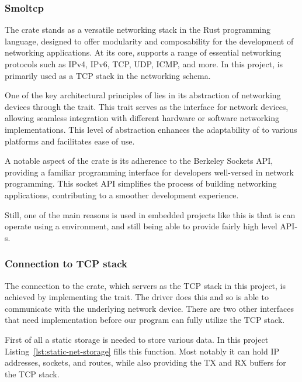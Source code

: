 \subsubsection{Smoltcp}

The  crate stands as a versatile networking stack in the Rust programming language, designed to offer modularity and composability for the development of networking applications. At its core,  supports a range of essential networking protocols such as IPv4, IPv6, TCP, UDP, ICMP, and more. In this project,  is primarily used as a TCP stack in the networking schema. \cite{Smoltcp}

One of the key architectural principles of  lies in its abstraction of networking devices through the  trait. This trait serves as the interface for network devices, allowing seamless integration with different hardware or software networking implementations. This level of abstraction enhances the adaptability of  to various platforms and facilitates ease of use.

A notable aspect of the crate is its adherence to the Berkeley Sockets API, providing a familiar programming interface for developers well-versed in network programming. This socket API simplifies the process of building networking applications, contributing to a smoother development experience.

Still, one of the main reasons  is used in embedded projects like this is that is can operate using a  environment, and still being able to provide fairly high level API-s.

\subsubsection{Connection to TCP stack}

The connection to the  crate, which servers as the TCP stack in this project, is achieved by implementing the  trait. The driver does this and so  is able to communicate with the underlying network device. There are two other interfaces that need implementation before our program can fully utilize the TCP stack.

First of all a static storage is needed to store various data. In this project Listing~\ref{lst:static-net-storage} fills this function. Most notably it can hold IP addresses, sockets, and routes, while also providing the TX and RX buffers for the TCP stack.

